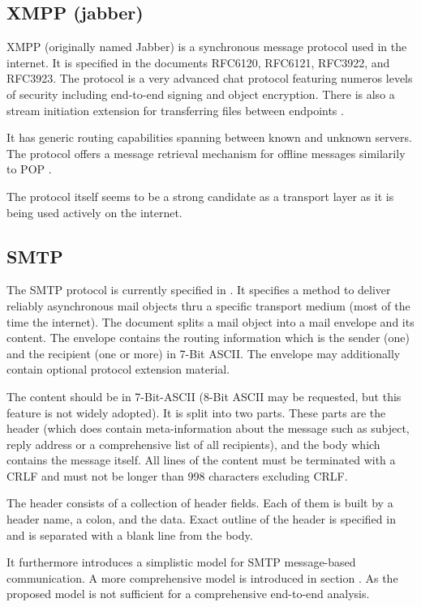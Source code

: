 \documentclass[a4paper,appendixprefix,pdfusetitle,twocolumn,fontsize=8pt,draft,DIV=calc]{scrbook}
\begin{document}
\subsection{XMPP (jabber)}
XMPP (originally named Jabber) is a synchronous message protocol used in the internet. It is specified in the documents RFC6120\cite{RFC6120}, RFC6121\cite{RFC6120}, RFC3922\cite{RFC3922}, and RFC3923\cite{RFC3923}. The protocol is a very advanced chat protocol featuring numeros levels of security including end-to-end signing and object encryption\cite{RFC3923}. There is also a stream initiation extension for transferring files between endpoints \cite{xep0096}.

It has generic routing capabilities spanning between known and unknown servers. The protocol offers a message retrieval mechanism for offline messages similarily to POP \cite{xep0013}.

The protocol itself seems to be a strong candidate as a transport layer as it is being used actively on the internet.

\subsection{SMTP}
The SMTP protocol is currently specified in \cite{RFC5321}. It specifies a method to deliver reliably asynchronous mail objects thru a specific transport medium (most of the time the internet). The document splits a mail object into a mail envelope and its content. The envelope contains the routing information which is the sender (one) and the recipient (one or more) in 7-Bit ASCII. The envelope may additionally contain optional protocol extension material. 

The content should be in 7-Bit-ASCII (8-Bit ASCII may be requested, but this feature is not widely adopted). It is split into two parts. These parts are the header (which does contain meta-information about the message such as subject, reply address or a comprehensive list of all recipients), and the body which contains the message itself. All lines of the content must be terminated with a CRLF and must not be longer than 998 characters excluding CRLF.

The header consists of a collection of header fields. Each of them is built by a header name, a colon, and the data. Exact outline of the header is specified in \cite{RFC5322} and is separated with a blank line from the body. 

It \cite{RFC5321} furthermore introduces a simplistic model for SMTP message-based communication. A more comprehensive model is introduced in section . As the proposed model is not sufficient for a comprehensive end-to-end analysis.
\end{document}

